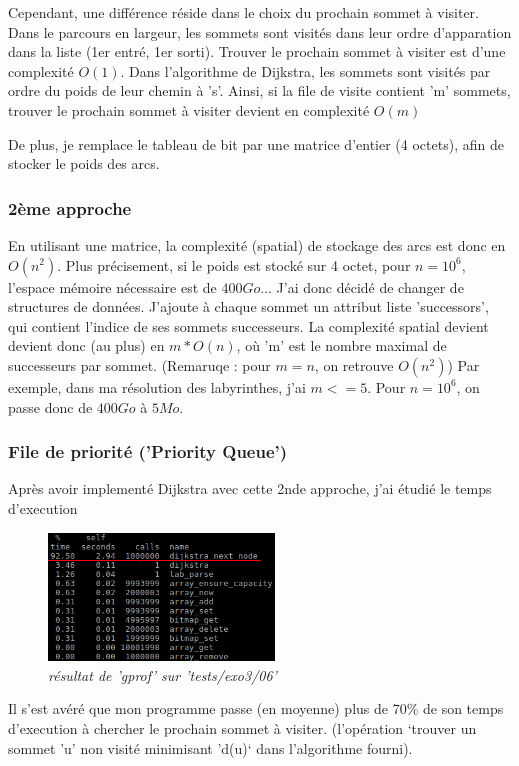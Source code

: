 \documentclass[10pt]{article}
\begin{document}
				Cependant, une différence réside dans le choix du prochain sommet à visiter. Dans le parcours en largeur,
				les sommets sont visités dans leur ordre d'apparation dans la liste (1er entré, 1er sorti).
				Trouver le prochain sommet à visiter est d'une complexité \textbf{\(O(1)\)}.\newline\newline
				Dans l'algorithme de Dijkstra, les sommets sont visités par ordre du poids de leur chemin à 's'.
				Ainsi, si la file de visite contient 'm' sommets, trouver le prochain sommet
				à visiter devient en complexité \(O(m)\)
				
				De plus, je remplace le tableau de bit par une matrice d'entier (4 octets),
				afin de stocker le poids des arcs.
				
			\subsubsection{2ème approche}
											
				En utilisant une matrice, la complexité (spatial) de stockage des arcs est donc en \(O(n^2)\).
				Plus précisement, si le poids est stocké sur 4 octet, pour \(n=10^6\),
				l'espace mémoire nécessaire est de \(400Go\)... J'ai donc décidé de changer de structures de données.
				J'ajoute à chaque sommet un attribut liste 'successors', qui contient l'indice de ses sommets successeurs.
				La complexité spatial devient devient donc (au plus) en \(m * O(n)\), où 'm' est
				le nombre maximal de successeurs par sommet. (Remaruqe : pour \(m = n\), on retrouve \(O(n^2)\))
				Par exemple, dans ma résolution des labyrinthes, j'ai \(m <= 5\). Pour \(n=10^6\),
				on passe donc de \(400Go\) à \(5 Mo\).
				
			\subsubsection{File de priorité ('Priority Queue')}
				Après avoir implementé Dijkstra avec cette 2nde approche, j'ai étudié le temps d'execution
				\begin{figure}[H]
					\begin{center}
						\includegraphics[width=6cm,height=\textheight,keepaspectratio]{./images/no_pqueue.png}
					\end{center}
				    \caption{\textit{résultat de 'gprof' sur 'tests/exo3/06'}}
				\end{figure}
				Il s'est avéré que mon programme passe (en moyenne) plus de 70\% de
				son temps d'execution à chercher le prochain sommet à visiter.
				(l'opération `trouver un sommet 'u' non visité minimisant 'd(u)` dans l'algorithme fourni).\newline
				
\end{document}
